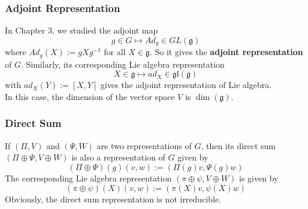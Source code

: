 \documentclass[11pt]{book}
\newcommand{\mf}[1]{\mathfrak{#1}}
\begin{document}
\subsubsection{Adjoint Representation}
In Chapter 3, we studied the adjoint map
$$g \in G \mapsto Ad_g \in GL(\mf{g})$$
where $Ad_g(X) := gXg^{-1}$ for all $X \in \mf{g}$. So it gives the \textbf{adjoint representation} of $G$. Similarly, its corresponding Lie algebra representation
$$X \in \mf{g} \mapsto ad_X \in \mf{gl}(\mf{g})$$
with $ad_X(Y) := [X,Y]$ gives the adjoint representation of Lie algebra.\\
In this case, the dimension of the vector space $V$ is $\dim(\mf{g})$.
\subsubsection{Direct Sum}
If $(\Pi,V)$ and $(\Psi,W)$ are two representations of $G$, then its direct sum $(\Pi \oplus \Psi, V \oplus W)$ is also a representation of $G$ given by
$$(\Pi \oplus \Psi)(g)(v,w) := (\Pi(g)v, \Psi(g)w)$$
The corresponding Lie algebra representation $(\pi \oplus \psi, V \oplus W)$ is given by
$$(\pi \oplus \psi)(X)(v,w) := (\pi(X)v, \psi(X)w)$$
Obviously, the direct sum representation is not irreducible.
\end{document}
